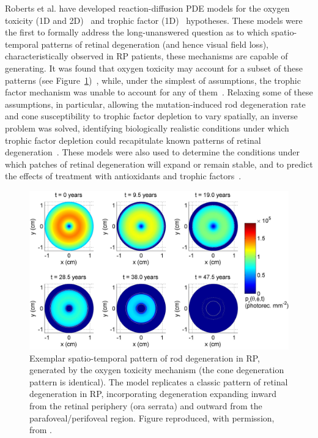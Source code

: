 \documentclass{article}
\begin{document}
Roberts et al. have developed reaction-diffusion PDE models for the oxygen toxicity (1D and 2D)~\cite{Roberts_et_al_2017,Roberts_et_al_2018a} and trophic factor (1D)~\cite{Roberts_2022a,Roberts_2022b} hypotheses.
These models were the first to formally address the long-unanswered question as to which spatio-temporal patterns of retinal degeneration (and hence visual field loss), characteristically observed in RP patients, these mechanisms are capable of generating.
It was found that oxygen toxicity may account for a subset of these patterns (see Figure~\ref{Fig_Roberts2018})~\cite{Roberts_et_al_2017,Roberts_et_al_2018a}, while, under the simplest of assumptions, the trophic factor mechanism was unable to account for any of them~\cite{Roberts_2022a}.
Relaxing some of these assumptions, in particular, allowing the mutation-induced rod degeneration rate and cone susceptibility to trophic factor depletion to vary spatially, an inverse problem was solved, identifying biologically realistic conditions under which trophic factor depletion could recapitulate known patterns of retinal degeneration~\cite{Roberts_2022b}.
These models were also used to determine the conditions under which patches of retinal degeneration will expand or remain stable, and to predict the effects of treatment with antioxidants and trophic factors~\cite{Roberts_2022a,Roberts_et_al_2017,Roberts_et_al_2018a}.
%
\begin{figure}
\begin{center}
\includegraphics[scale=0.24]{Roberts_et_al_2018_Fig_5_a}
\end{center}
\caption{Exemplar spatio-temporal pattern of rod degeneration in RP, generated by the oxygen toxicity mechanism (the cone degeneration pattern is identical). The model replicates a classic pattern of retinal degeneration in RP, incorporating degeneration expanding inward from the retinal periphery (ora serrata) and outward from the parafoveal/perifoveal region. Figure reproduced, with permission, from \citet{Roberts_et_al_2018a}.}
\label{Fig_Roberts2018}
\end{figure}
%
\end{document}

